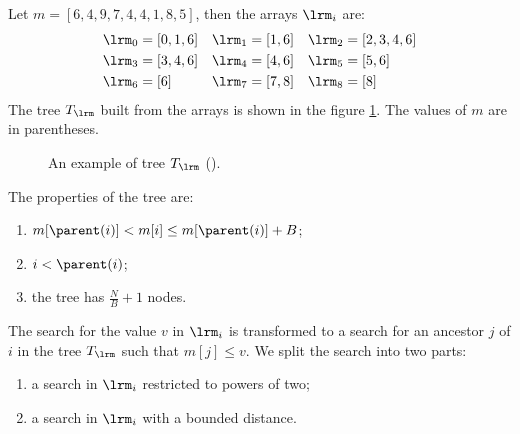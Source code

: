 \begin{example}
	Let $m = [6, 4, 9, 7, 4, 4, 1, 8, 5]$, then the arrays $\lrm_i$ are:
	\begin{align*}
		\lrm_0 &= [0, 1, 6] &
		\lrm_1 &= [1, 6] &
		\lrm_2 &= [2, 3, 4, 6] \\
		\lrm_3 &= [3, 4, 6] &
		\lrm_4 &= [4, 6] &
		\lrm_5 &= [5, 6] \\
		\lrm_6 &= [6] &
		\lrm_7 &= [7, 8] &
		\lrm_8 &= [8]
	\end{align*}
	The tree $T_{\lrm}$ built from the arrays is shown in the figure \ref{fig:ex:tlrm}.
	The values of $m$ are in parentheses.
	
	\begin{figure}
		\centering
		\caption{An example of tree $T_{\lrm}$ (\cite{sadakane2010fully}).}
		\label{fig:ex:tlrm}
	\end{figure}
\end{example}

The properties of the tree are:
\begin{enumerate}
	\item $m[\parent(i)] < m[i] \le m[\parent(i)] + B$;
	\item $i < \parent(i)$;
	\item the tree has $\frac{N}{B} + 1$ nodes.
\end{enumerate}

The search for the value $v$ in $\lrm_i$ is transformed to a search for an ancestor $j$ of $i$ in the tree $T_{\lrm}$ such that $m[j] \le v$.
We split the search into two parts:
\begin{enumerate}
	\item a search in $\lrm_i$ restricted to powers of two;
	\item a search in $\lrm_i$ with a bounded distance.
\end{enumerate}

